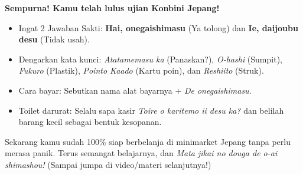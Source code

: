 \vspace{2em}
\begin{tcolorbox}[
    colback=blue!5!white,
    colframe=blue!80!black,
    boxrule=3pt,
    arc=5mm,
    title={\huge\bfseries \sffamily 🌟 Rangkuman Misi Konbini 🌟},
    fonttitle=\color{white},
    attach boxed title to top center={yshift=-4mm},
    boxed title style={colback=blue!80!black, rounded corners},
    left=5mm, right=5mm, top=7mm, bottom=5mm
]
\Large \textbf{Sempurna! Kamu telah lulus ujian Konbini Jepang!}
\begin{itemize}
    \item Ingat 2 Jawaban Sakti: \textbf{Hai, onegaishimasu} (Ya tolong) dan \textbf{Ie, daijoubu desu} (Tidak usah).
    \item Dengarkan kata kunci: \textit{Atatamemasu ka} (Panaskan?), \textit{O-hashi} (Sumpit), \textit{Fukuro} (Plastik), \textit{Pointo Kaado} (Kartu poin), dan \textit{Reshiito} (Struk).
    \item Cara bayar: Sebutkan nama alat bayarnya + \textit{De onegaishimasu}.
    \item Toilet darurat: Selalu sapa kasir \textit{Toire o karitemo ii desu ka?} dan belilah barang kecil sebagai bentuk kesopanan.
\end{itemize}
Sekarang kamu sudah 100\% siap berbelanja di minimarket Jepang tanpa perlu merasa panik. Terus semangat belajarnya, dan \textit{Mata jikai no douga de o-ai shimashou!} (Sampai jumpa di video/materi selanjutnya!)
\end{tcolorbox}

\newpage